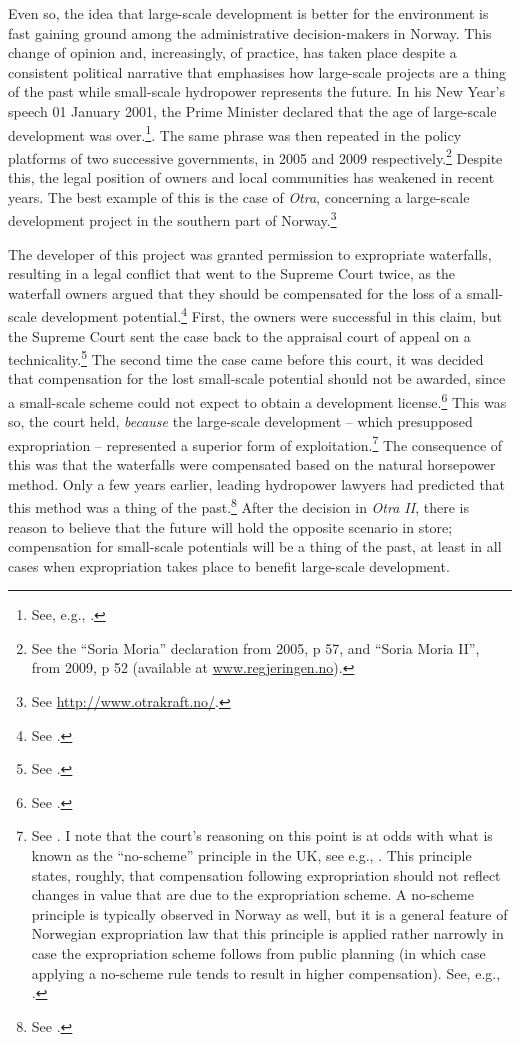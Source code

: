 Even so, the idea that large-scale development is better for the environment is fast gaining ground among the administrative decision-makers in Norway. This change of opinion and, increasingly, of practice, has taken place despite a consistent political narrative that emphasises how large-scale projects are a thing of the past while small-scale hydropower represents the future. In his New Year's speech 01 January 2001, the Prime Minister declared that the age of large-scale development was over.\footnote{See, e.g., \cite[34]{haltbrekken12}.}. The same phrase was then repeated in the policy platforms of two successive governments, in 2005 and 2009 respectively.\footnote{See the ``Soria Moria'' declaration from 2005, p 57, and ``Soria Moria II'', from 2009, p 52 (available at \url{www.regjeringen.no}).} Despite this, the legal position of owners and local communities has weakened in recent years. The best example of this is the case of {\it Otra}, concerning a large-scale development project in the southern part of Norway.\footnote{See \url{http://www.otrakraft.no/}.} 

The developer of this project was granted permission to expropriate waterfalls, resulting in a legal conflict that went to the Supreme Court twice, as the waterfall owners argued that they should be compensated for the loss of a small-scale development potential.\footnote{See \cite{otra10,otra13}.} First, the owners were successful in this claim, but the Supreme Court sent the case back to the appraisal court of appeal on a technicality.\footnote{See \cite{otra10}.} The second time the case came before this court, it was decided that compensation for the lost small-scale potential should not be awarded, since a small-scale scheme could not expect to obtain a development license.\footnote{See \cite{otra13}.} This was so, the court held, {\it because} the large-scale development -- which presupposed expropriation -- represented a superior form of exploitation.\footnote{See \cite{otra13}. I note that the court's reasoning on this point is at odds with what is known as the ``no-scheme'' principle in the UK, see e.g., \cite{lawcom01}. This principle states, roughly, that compensation following expropriation should not reflect changes in value that are due to the expropriation scheme. A no-scheme principle is typically observed in Norway as well, but it is a general feature of Norwegian expropriation law that this principle is applied rather narrowly in case the expropriation scheme follows from public planning (in which case applying a no-scheme rule tends to result in higher compensation). See, e.g., \cite{stordrange07}.} The consequence of this was that the waterfalls were compensated based on the natural horsepower method. Only a few years earlier, leading hydropower lawyers had predicted that this method was a thing of the past.\footnote{See \cite{larsen12}.} After the decision in {\it Otra II}, there is reason to believe that the future will hold the opposite scenario in store; compensation for small-scale potentials will be a thing of the past, at least in all cases when expropriation takes place to benefit large-scale development.


